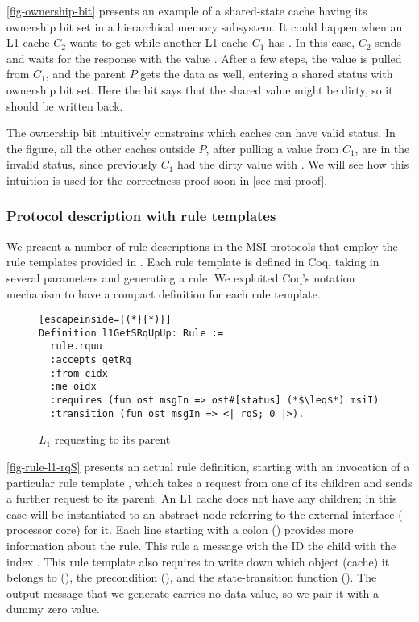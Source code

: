 \autoref{fig-ownership-bit} presents an example of a shared-state cache having its ownership bit set in a hierarchical memory subsystem.
It could happen when an L1 cache $C_2$ wants to get \stS{} while another L1 cache $C_1$ has \stM{}.
In this case, $C_2$ sends  and waits for the response with the value .
After a few steps, the value is pulled from $C_1$, and the parent $P$ gets the data as well, entering a shared status with ownership bit set.
Here the bit says that the shared value might be dirty, so it should be written back.

The ownership bit intuitively constrains which caches can have valid status.
In the figure, all the other caches outside $P$, after pulling a value from $C_1$, are in the invalid status, since previously $C_1$ had the dirty value with \stM{}.
We will see how this intuition is used for the correctness proof soon in \autoref{sec-msi-proof}.

\subsubsection{Protocol description with rule templates}

We present a number of rule descriptions in the MSI protocols that employ the rule templates provided in \hemiola{}.
Each rule template is defined in Coq, taking in several parameters and generating a rule.
We exploited Coq's notation mechanism to have a compact definition for each rule template.

\begin{figure}[h]
  \centering
\begin{lstlisting}[escapeinside={(*}{*)}]
Definition l1GetSRqUpUp: Rule :=
  rule.rquu
  :accepts getRq
  :from cidx
  :me oidx
  :requires (fun ost msgIn => ost#[status] (*$\leq$*) msiI)
  :transition (fun ost msgIn => <| rqS; 0 |>).
\end{lstlisting}
  \caption{$L_1$ requesting \stS{} to its parent}
  \label{fig-rule-l1-rqS}
\end{figure}

\autoref{fig-rule-l1-rqS} presents an actual rule definition, starting with an invocation of a particular rule template , which takes a request from one of its children and sends a further request to its parent.
An L1 cache does not have any children; in this case  will be instantiated to an abstract node referring to the external interface (\ie{} processor core) for it.
Each line starting with a colon (\slstinline{:}) provides more information about the rule.
This rule  a message with the ID   the child with the index .
This rule template also requires to write down which object (cache) it belongs to (), the precondition (), and the state-transition function ().
The output  message that we generate carries no data value, so we pair it with a dummy zero value.

